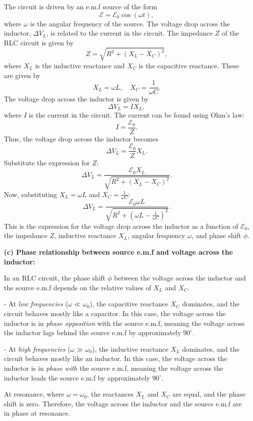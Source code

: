 \documentclass{article}
\begin{document}
The circuit is driven by an e.m.f source of the form
\[
\mathcal{E} = \mathcal{E}_0 \cos(\omega t),
\]
where $\omega$ is the angular frequency of the source. The voltage drop across the inductor, $\Delta V_L$, is related to the current in the circuit. The impedance $Z$ of the RLC circuit is given by
\[
Z = \sqrt{R^2 + (X_L - X_C)^2},
\]
where $X_L$ is the inductive reactance and $X_C$ is the capacitive reactance. These are given by
\[
X_L = \omega L, \quad X_C = \frac{1}{\omega C}.
\]
The voltage drop across the inductor is given by
\[
\Delta V_L = I X_L,
\]
where $I$ is the current in the circuit. The current can be found using Ohm's law:
\[
I = \frac{\mathcal{E}_0}{Z}.
\]
Thus, the voltage drop across the inductor becomes
\[
\Delta V_L = \frac{\mathcal{E}_0}{Z} X_L.
\]
Substitute the expression for $Z$:
\[
\Delta V_L = \frac{\mathcal{E}_0 X_L}{\sqrt{R^2 + (X_L - X_C)^2}}.
\]
Now, substituting $X_L = \omega L$ and $X_C = \frac{1}{\omega C}$:
\[
\Delta V_L = \frac{\mathcal{E}_0 \omega L}{\sqrt{R^2 + \left(\omega L - \frac{1}{\omega C}\right)^2}}.
\]
This is the expression for the voltage drop across the inductor as a function of $\mathcal{E}_0$, the impedance $Z$, inductive reactance $X_L$, angular frequency $\omega$, and phase shift $\phi$.

\textbf{(c) Phase relationship between source e.m.f and voltage across the inductor:}

In an RLC circuit, the phase shift $\phi$ between the voltage across the inductor and the source e.m.f depends on the relative values of $X_L$ and $X_C$.

- At \textit{low frequencies} ($\omega \ll \omega_0$), the capacitive reactance $X_C$ dominates, and the circuit behaves mostly like a capacitor. In this case, the voltage across the inductor is in \textit{phase opposition} with the source e.m.f, meaning the voltage across the inductor lags behind the source e.m.f by approximately $90^\circ$.
  
- At \textit{high frequencies} ($\omega \gg \omega_0$), the inductive reactance $X_L$ dominates, and the circuit behaves mostly like an inductor. In this case, the voltage across the inductor is in \textit{phase with} the source e.m.f, meaning the voltage across the inductor leads the source e.m.f by approximately $90^\circ$.

At resonance, where $\omega = \omega_0$, the reactances $X_L$ and $X_C$ are equal, and the phase shift is zero. Therefore, the voltage across the inductor and the source e.m.f are in phase at resonance.
\end{document}
